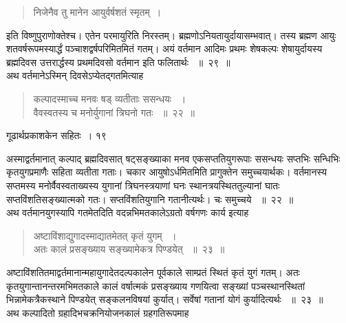 \documentclass[11pt, openany]{book}
\begin{document}
  
 \begin{quote}
{\ssi निजेनैव तु मानेन आयुर्वर्षशतं स्मृतम्~।}
\end{quote}
\begin{sloppypar}
 इति विष्णुपुराणोक्तेश्च। एतेन परमायुरिति निरस्तम्। ब्रह्मणोऽनियतायुर्दायासम्भवात्। तस्य ब्रह्मण आयुः शतवर्षरूपमस्यार्द्धं पञ्चाशद्वर्षपरिमितमितं गतम्। अयं वर्तमान आदिमः प्रथमः शेषकल्पः शेषायुर्दायस्य ब्रह्मदिवस उत्तरार्द्धस्य प्रथमदिवसो वर्तमान इति फलितार्थः ~॥~२९~॥\\ 
 \noindent अथ वर्तमानेऽस्मिन् दिवसेऽप्येतद्गतमित्याह\textendash
\end{sloppypar}

 
 \begin{quote}
 {\ssi कल्पादस्माच्च मनवः षड् व्यतीताः ससन्धयः ~।\\
वैवस्वतस्य च मनोर्युगानां त्रिघनो गतः ~॥~२२~॥}
\end{quote}
\newpage

\hspace{3cm} गूढार्थप्रकाशकेन सहितः~। \hfill १९
\vspace{1cm}

\begin{sloppypar}
 अस्माद्वर्तमानात् कल्पाद् ब्रह्मदिवसात् षट्सङ्ख्याका मनव एकसप्ततियुगरूपाः ससन्धयः सप्तभिः सन्धिभिः कृतयुगप्रमाणैः सहिता व्यतीता गताः। चकार आयुषोऽर्धमितमिति प्रागुक्तेन समुच्चयार्थकः। वर्तमानस्य सप्तमस्य मनोर्वैवस्वताख्यस्य युगानां त्रिघनस्त्रयाणां घनः स्थानत्रयस्थिततुल्यानां घातः सप्तविंशतिसङ्ख्यात्मको गतः। सप्तविंशतियुगानि गतानीत्यर्थः। चः समुच्चये ~॥~२२~॥\\ 
 \noindent अथ वर्तमानयुगस्यापि गतमेतदिति वदन्नभिमतकालेऽग्रतो वर्षगणः कार्य इत्याह\textendash
\end{sloppypar}

 
 \begin{quote}
  {\ssi अष्टाविंशाद्युगादस्माद्यातमेतत् कृतं युगम् ~।\\
अतः कालं प्रसङ्ख्याय सङ्ख्यामेकत्र पिण्डयेत् ~॥~२३~॥}
 \end{quote}
\begin{sloppypar}
 अष्टाविंशतितमाद्वर्तमानान्महायुगादेतदल्पकालेन पूर्वकाले साम्प्रतं स्थितं कृतं युगं गतम्। अतः कृतयुगान्तानन्तरमभिमतकाले कालं वर्षात्मकं प्रसङ्ख्याय गणयित्वा सङ्ख्यां पञ्चस्थानस्थितां भिन्नामेकत्रैकस्थाने पिण्डयेत् सङ्कलनविषयां कुर्यात्। सर्वेषां गतानां योगं कुर्यादित्यर्थः ~॥~२३~॥\\ 
 \noindent अथ कल्पादितो ग्रहादिभचक्रनियोजनकालं ग्रहगतिरूपमाह\textendash
\end{sloppypar}
\end{document}
